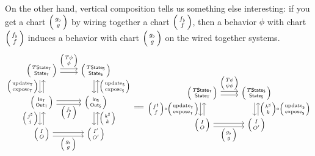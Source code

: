 \documentclass[DynamicalBook]{subfiles}
\begin{document}
On the other hand, vertical composition tells us something else interesting: if
you get a chart $\lens{g_{\flat}}{g}$ by wiring together a chart
$\lens{f_{\flat}}{f}$, then a behavior $\phi$ with
chart $\lens{f_{\flat}}{f}$ induces a behavior with chart $\lens{g_{\flat}}{g}$
on the wired together systems.
\[
  \begin{tikzcd}
    \lens{T\State{T}}{\State{T}} \ar[r, shift left, "\lens{T\phi}{\phi}"] \ar[r, shift right] \ar[d, shift right,
    "\lens{\update{T}}{\expose{T}}"'] \ar[d, shift left, leftarrow] &
    \lens{T\State{S}}{\State{S}} \ar[d, shift left, leftarrow,
    "\lens{\update{S}}{\expose{S}}"] \ar[d, shift right]\\
    \lens{\In{T}}{\Out{T}} \ar[d, shift right, "\lens{j^{\sharp}}{j}"'] \ar[d, shift left,
        leftarrow] \ar[r, shift right, "\lens{f_{\flat}}{f}"']
    \ar[r, shift left] & \lens{\In{S}}{\Out{S}} \ar[d, shift left, leftarrow,
        "\lens{k^{\sharp}}{k}"] \ar[d, shift right]\\
    \lens{I}{O} \ar[r, shift right, "\lens{g_{\flat}}{g}"']
    \ar[r, shift left] & \lens{I'}{O'} \\
  \end{tikzcd} \xequals{\quad}
  \begin{tikzcd}
    \lens{T\State{T}}{\State{T}} \ar[r, shift left, "\lens{T\phi}{\psi\phi}"] \ar[r, shift right] \ar[d, shift right,
    "\lens{f^{\sharp}}{f} \circ \lens{\update{T}}{\expose{T}}"'] \ar[d, shift left, leftarrow] &
    \lens{T\State{S}}{\State{S}} \ar[d, shift left, leftarrow,
    "\lens{k^{\sharp}}{k} \circ \lens{\update{S}}{\expose{S}}"] \ar[d, shift right]\\
    \lens{I}{O} \ar[r, shift right, "\lens{g_{\flat}}{g}"']
    \ar[r, shift left] & \lens{I}{O'}
  \end{tikzcd}
\]
\end{document}

